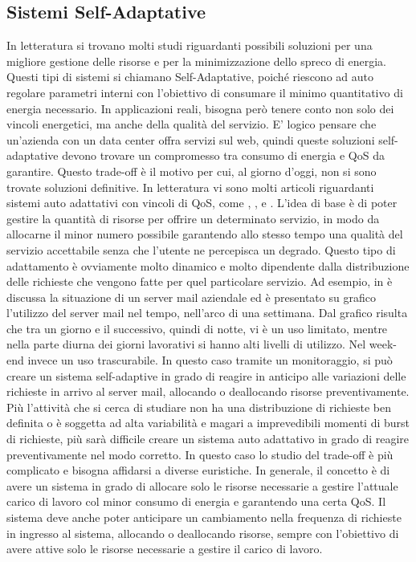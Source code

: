 \subsection{Sistemi Self-Adaptative}
In letteratura si trovano molti studi riguardanti possibili soluzioni per una migliore gestione delle risorse e per la minimizzazione dello spreco di energia. Questi tipi di sistemi si chiamano Self-Adaptative, poiché riescono ad auto regolare parametri interni con l'obiettivo di consumare il minimo quantitativo di energia necessario. In applicazioni reali, bisogna però tenere conto non solo dei vincoli energetici, ma anche della qualità del servizio. E' logico pensare che un'azienda con un data center offra servizi sul web, quindi queste soluzioni self-adaptative devono trovare un compromesso tra consumo di energia e \acf{QoS} da garantire. Questo trade-off è il motivo per cui, al giorno d'oggi, non si sono trovate soluzioni definitive. In letteratura vi sono molti articoli riguardanti sistemi auto adattativi con vincoli di \acs{QoS}, come \cite{PerezMirandolaMers2007-qosbw}, \cite{MarzollaMirandola2013-dpm}, \cite{PerezMirandolaMerseguer2014-relQoSandSWadapt} e \cite{PerezMirandolaMerseguer2014-QoSandPetriNets}. L'idea di base è di poter gestire la quantità di risorse per offrire un determinato servizio, in modo da allocarne il minor numero possibile garantendo allo stesso tempo una qualità del servizio accettabile senza che l'utente ne percepisca un degrado. Questo tipo di adattamento è ovviamente molto dinamico e molto dipendente dalla distribuzione delle richieste che vengono fatte per quel particolare servizio. Ad esempio, in \cite{PerezMirandolaMerseguer2014-QoSandPetriNets} è discussa la situazione di un server mail aziendale ed è presentato su grafico l'utilizzo del server mail nel tempo, nell'arco di una settimana. Dal grafico risulta che tra un giorno e il successivo, quindi di notte, vi è un uso limitato, mentre nella parte diurna dei giorni lavorativi si hanno alti livelli di utilizzo. Nel week-end invece un uso trascurabile. In questo caso tramite un monitoraggio, si può creare un sistema self-adaptive in grado di reagire in anticipo alle variazioni delle richieste in arrivo al server mail, allocando o deallocando risorse preventivamente. Più l'attività che si cerca di studiare non ha una distribuzione di richieste ben definita o è soggetta ad alta variabilità e magari a imprevedibili momenti di burst di richieste, più sarà difficile creare un sistema auto adattativo in grado di reagire preventivamente nel modo corretto. In questo caso lo studio del trade-off è più complicato e bisogna affidarsi a diverse euristiche. In generale, il concetto è di avere un sistema in grado di allocare solo le risorse necessarie a gestire l'attuale carico di lavoro col minor consumo di energia e garantendo una certa \acs{QoS}. Il sistema deve anche poter anticipare un cambiamento nella frequenza di richieste in ingresso al sistema, allocando o deallocando risorse, sempre con l'obiettivo di avere attive solo le risorse necessarie a gestire il carico di lavoro.


